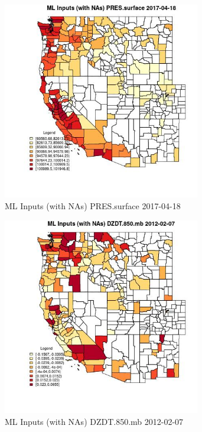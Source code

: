 \begin{figure} 
\centering  
\includegraphics[width=0.77\textwidth]{Code_Outputs/Report_ML_input_PM25_Step4_part_f_de_duplicated_aveswNAs_CountyPRESsurfaceMean2017-04-18.jpg} 
\caption{\label{fig:Report_ML_input_PM25_Step4_part_f_de_duplicated_aveswNAsCountyPRESsurfaceMean2017-04-18}ML Inputs (with NAs) PRES.surface 2017-04-18} 
\end{figure} 
 

\begin{figure} 
\centering  
\includegraphics[width=0.77\textwidth]{Code_Outputs/Report_ML_input_PM25_Step4_part_f_de_duplicated_aveswNAs_CountyDZDT850mbMean2012-02-07.jpg} 
\caption{\label{fig:Report_ML_input_PM25_Step4_part_f_de_duplicated_aveswNAsCountyDZDT850mbMean2012-02-07}ML Inputs (with NAs) DZDT.850.mb 2012-02-07} 
\end{figure} 
 


